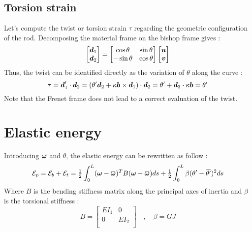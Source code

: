 \subsection{Torsion strain}
Let’s compute the twist or torsion strain $\tau$ regarding the geometric configuration of the rod. Decomposing the material frame on the bishop frame gives :
\begin{equation}
	\begin{bmatrix}
		\boldsymbol{d}_1\\
		\boldsymbol{d}_2\\
	\end{bmatrix} =
		\begin{bmatrix}
		\cos{\theta} & \sin{\theta}\\
		-\sin{\theta} & \cos{\theta}\\
	\end{bmatrix}
	\begin{bmatrix}
		\boldsymbol{u}\\
		\boldsymbol{v}\\
	\end{bmatrix}
\end{equation}
Thus, the twist can be identified directly as the variation of $\theta$ along the curve :
\begin{equation}
	\tau = \boldsymbol{d}'_1 \cdot \boldsymbol{d}_2 = (\theta'\boldsymbol{d}_2 + \kappa\boldsymbol{b}\times\boldsymbol{d}_1)\cdot \boldsymbol{d}_2 = \theta' + \boldsymbol{d}_3\cdot\kappa\boldsymbol{b} = \theta'
\end{equation}
Note that the Frenet frame does not lead to a correct evaluation of the twist.

\section{Elastic energy}
Introducing $\boldsymbol{\omega}$ and $\theta$, the elastic energy can be rewritten as follow :
\begin{equation}
		\mathcal{E}_{p} = \mathcal{E}_{b} + \mathcal{E}_{t} = 
		\tfrac{1}{2} \int_{0}^{L} (\vect{\omega}-\overbar{\vect{\omega}})^T B (\vect{\omega}-\overbar{\vect{\omega}}) ds
		+ \tfrac{1}{2} \int_{0}^{L} \beta(\theta' -{\overbar{\theta'}})^2 ds
\end{equation}
Where $B$ is the bending stiffness matrix along the principal axes of inertia and $\beta$ is the torsional stiffness :
\begin{equation}
	B = \begin{bmatrix}
			EI_1	&	0\\
			0	&	EI_2\\
		\end{bmatrix}
	\quad,\quad
	\beta = GJ
\end{equation}

